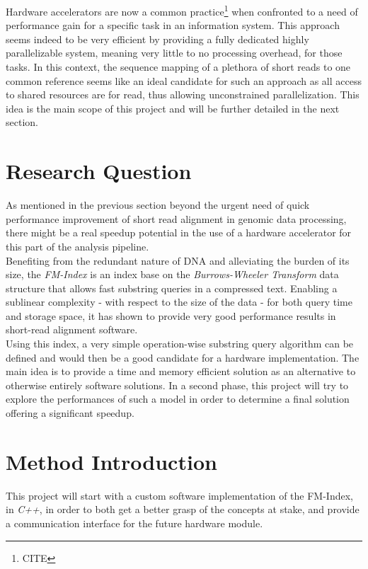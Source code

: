 Hardware accelerators are now a common practice\footnote{CITE} when confronted to a need of performance gain for a specific task in an information system. This approach seems indeed to be very efficient by providing a fully dedicated highly parallelizable system, meaning very little to no processing overhead, for those tasks. In this context, the sequence mapping of a plethora of short reads to one common reference seems like an ideal candidate for such an approach as all access to shared resources are for read, thus allowing unconstrained parallelization. This idea is the main scope of this project and will be further detailed in the next section.

\section{Research Question}

As mentioned in the previous section beyond the urgent need of quick performance improvement of short read alignment in genomic data processing, there might be a real speedup potential in the use of a hardware accelerator for this part of the analysis pipeline. \\

Benefiting from the redundant nature of DNA and alleviating the burden of its size, the \textsl{FM-Index} is an index base on the \textsl{Burrows-Wheeler Transform} data structure that allows fast substring queries in a compressed text. Enabling a sublinear complexity - with respect to the size of the data - for both query time and storage space, it has shown to provide very good performance results in short-read alignment software. \\

Using this index, a very simple operation-wise substring query algorithm can be defined and would then be a good candidate for a hardware implementation. The main idea is to provide a time and memory efficient solution as an alternative to otherwise entirely software solutions. In a second phase, this project will try to explore the performances of such a model in order to determine a final solution offering a significant speedup.

\section{Method Introduction}

This project will start with a custom software implementation of the FM-Index, in \textsl{C++}, in order to both get a better grasp of the concepts at stake, and provide a communication interface for the future hardware module.

